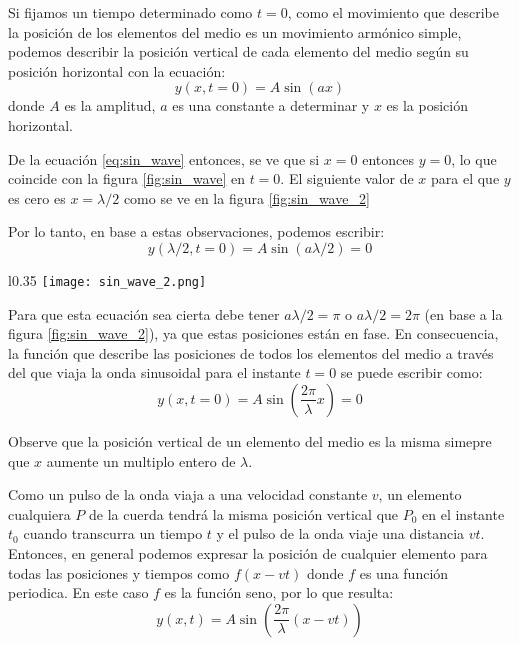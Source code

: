 Si fijamos un tiempo determinado como \(t=0\), como el movimiento que describe la posición de los elementos del medio es un movimiento armónico simple, podemos describir la posición vertical de cada elemento del medio según su posición horizontal con la ecuación:
\begin{equation}
  y(x, t=0) = A \sin(ax)
  \label{eq:sin_wave}
\end{equation}
donde \(A\) es la amplitud, \(a\) es una constante a determinar y \(x\) es la posición horizontal. 

De la ecuación \ref{eq:sin_wave} entonces, se ve que si \(x=0\) entonces \(y=0\), lo que coincide con la figura \ref{fig:sin_wave} en \(t=0\). El siguiente valor de \(x\) para el que \(y\) es cero es \(x=\lambda/2\) como se ve en la figura \ref{fig:sin_wave_2}

Por lo tanto, en base a estas observaciones, podemos escribir:
\[
  y(\lambda/2, t=0) = A \sin(a\lambda/2) = 0
\]
  
\begin{wrapfigure}{l}{0.35\textwidth}
  \centering
  \texttt{[image: sin\_wave\_2.png]}
  \caption{Instantánea de la cuerda en \(t=0\) donde una partícula \(P\) cualquiera tiene la misma posición vertical que \(P_0\) cuando la onda viaja una distancia \(v t\).}
  \label{fig:sin_wave_2}
\end{wrapfigure}
Para que esta ecuación sea cierta debe tener \(a\lambda/2 = \pi\) o \(a\lambda/2 = 2\pi\) (en base a la figura \ref{fig:sin_wave_2}), ya que estas posiciones están en fase. En consecuencia, la función que describe las posiciones de todos los elementos del medio a través del que viaja la onda sinusoidal para el instante \(t=0\) se puede escribir como:
\[
  y(x, t=0) = A \sin(\frac{2\pi}{\lambda} x) = 0
\]

Observe que la posición vertical de un elemento del medio es la misma simepre que \(x\) aumente un multiplo entero de \(\lambda\).

Como un pulso de la onda viaja a una velocidad constante \(v\), un elemento cualquiera \(P\) de la cuerda tendrá la misma posición vertical que \(P_0\) en el instante \(t_0\) cuando transcurra un tiempo \(t\) y el pulso de la onda viaje una distancia \(v t\). Entonces, en general podemos expresar la posición de cualquier elemento para todas las posiciones y tiempos como \(f(x - v t)\) donde \(f\) es una función periodica. En este caso \(f\) es la función seno, por lo que resulta:
\[
  y(x, t) = A \sin\left(\frac{2\pi}{\lambda} (x - v t)\right)
\]
  

